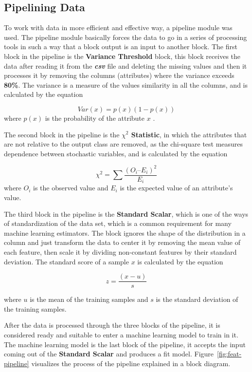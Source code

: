 \documentclass[conference]{IEEEtran}
\begin{document}
\subsection{Pipelining Data}
To work with data in more efficient and effective way, a pipeline module was used. The pipeline module basically forces the data to go in a series of processing tools in such a way that a block output is an input to another block. The first block in the pipeline is the \textbf{Variance Threshold} block, this block receives the data after reading it from the \textbf{\textit{csv}} file and deleting the missing values and then it processes it by removing the columns (attributes) where the variance exceeds \textbf{80\%}. The variance is a measure of the values similarity in all the columns, and is calculated by the equation 

\begin{equation}
Var(x)=p(x)(1-p(x))
\end{equation}
where $p(x)$ is the probability of the attribute $x$ .

The second block in the pipeline is the \textbf{$\chi^2$ Statistic}, in which the attributes that are not relative to the output class are removed, as the chi-square test measures dependence between stochastic variables, and is calculated by the equation

\begin{equation}
\chi^2 = \sum \frac{(O_i – E_i)^2}{E_i}
\end{equation}
where $O_i$ is the observed value and $E_i$ is the expected value of an attribute's value.

The third block in the pipeline is the \textbf{Standard Scalar}, which is one of the ways of standardization of the data set, which is a common requirement for many machine learning estimators. The block ignores the shape of the distribution in a column and just transform the data to center it by removing the mean value of each feature, then scale it by dividing non-constant features by their standard deviation. The standard score of a sample $x$ is calculated by the equation

\begin{equation}
z = \frac{(x - u)}{s}
\end{equation}

where $u$ is the mean of the training samples and $s$ is the standard deviation of the training samples.

After the data is processed through the three blocks of the pipeline, it is considered ready and suitable to enter a machine learning model to train in it. The machine learning model is the last block of the pipeline, it accepts the input coming out of the \textbf{Standard Scalar} and produces a fit model. Figure~\ref{fig:feat-pipeline} visualizes the process of the pipeline explained in a block diagram.
\end{document}
